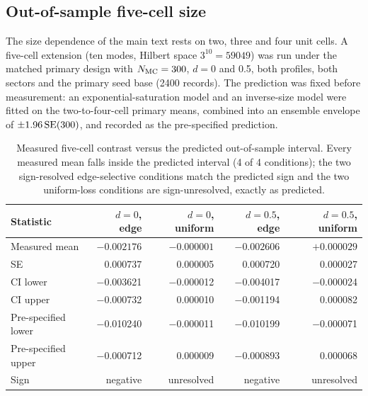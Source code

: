 \documentclass[aps,pra,preprint,superscriptaddress,amsmath,amssymb]{revtex4-2}
\begin{document}
\subsection{Out-of-sample five-cell size}
\label{sec:size5}

The size dependence of the main text rests on two, three and four unit cells. A five-cell extension (ten modes, Hilbert space $3^{10}=\num{59049}$) was run under the matched primary design with $N_{\rm MC}=\num{300}$, $d=\num{0}$ and \num{0.5}, both profiles, both sectors and the primary seed base (\num{2400} records). The prediction was fixed before measurement: an exponential-saturation model and an inverse-size model were fitted on the two-to-four-cell primary means, combined into an ensemble envelope of $\pm1.96\,{\rm SE}(\num{300})$, and recorded as the pre-specified prediction.

\begin{table}[h]
\caption{Measured five-cell contrast versus the predicted out-of-sample interval. Every measured mean falls inside the predicted interval (\num{4} of \num{4} conditions); the two sign-resolved edge-selective conditions match the predicted sign and the two uniform-loss conditions are sign-unresolved, exactly as predicted.}
\label{tab:size5}
\begin{ruledtabular}
\begin{tabular}{lrrrr}
Statistic & $d=\num{0}$, edge & $d=\num{0}$, uniform & $d=\num{0.5}$, edge & $d=\num{0.5}$, uniform \\
\hline
Measured mean & $-\num{0.002176}$ & $-\num{0.000001}$ & $-\num{0.002606}$ & $+\num{0.000029}$ \\
SE & \num{0.000737} & \num{0.000005} & \num{0.000720} & \num{0.000027} \\
CI lower & \num{-0.003621} & \num{-0.000012} & \num{-0.004017} & \num{-0.000024} \\
CI upper & \num{-0.000732} & \num{0.000010} & \num{-0.001194} & \num{0.000082} \\
Pre-specified lower & \num{-0.010240} & \num{-0.000011} & \num{-0.010199} & \num{-0.000071} \\
Pre-specified upper & \num{-0.000712} & \num{0.000009} & \num{-0.000893} & \num{0.000068} \\
Sign & negative & unresolved & negative & unresolved \\
\end{tabular}
\end{ruledtabular}
\end{table}
\end{document}
